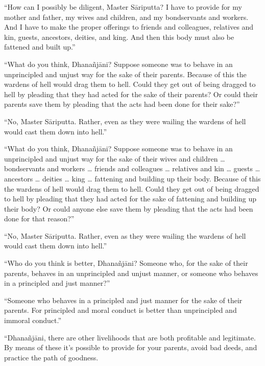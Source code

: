 \documentclass[12pt,openany]{book}%
\begin{document}
“How can I possibly be diligent, Master \textsanskrit{Sāriputta}? I have to provide for my mother and father, my wives and children, and my bondservants and workers. And I have to make the proper offerings to friends and colleagues, relatives and kin, guests, ancestors, deities, and king. And then this body must also be fattened and built up.” 

“What do you think, \textsanskrit{Dhanañjāni}? Suppose someone was to behave in an unprincipled and unjust way for the sake of their parents. Because of this the wardens of hell would drag them to hell. Could they get out of being dragged to hell by pleading that they had acted for the sake of their parents? Or could their parents save them by pleading that the acts had been done for their sake?” 

“No, Master \textsanskrit{Sāriputta}. Rather, even as they were wailing the wardens of hell would cast them down into hell.” 

“What do you think, \textsanskrit{Dhanañjāni}? Suppose someone was to behave in an unprincipled and unjust way for the sake of their wives and children … bondservants and workers … friends and colleagues … relatives and kin … guests … ancestors … deities … king … fattening and building up their body. Because of this the wardens of hell would drag them to hell. Could they get out of being dragged to hell by pleading that they had acted for the sake of fattening and building up their body? Or could anyone else save them by pleading that the acts had been done for that reason?” 

“No, Master \textsanskrit{Sāriputta}. Rather, even as they were wailing the wardens of hell would cast them down into hell.” 

“Who do you think is better, \textsanskrit{Dhanañjāni}? Someone who, for the sake of their parents, behaves in an unprincipled and unjust manner, or someone who behaves in a principled and just manner?” 

“Someone who behaves in a principled and just manner for the sake of their parents. For principled and moral conduct is better than unprincipled and immoral conduct.” 

“\textsanskrit{Dhanañjāni}, there are other livelihoods that are both profitable and legitimate. By means of these it’s possible to provide for your parents, avoid bad deeds, and practice the path of goodness. 
\end{document}
